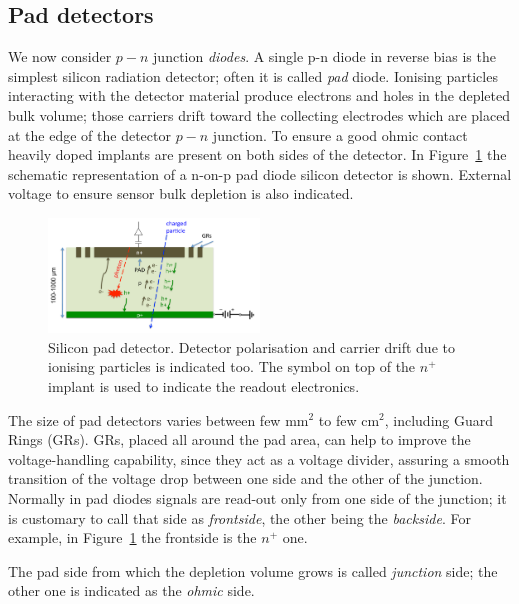 \subsection{Pad detectors}
\label{sec:pads}

We now consider $p-n$ junction {\it diodes}.
A single p-n diode in reverse bias is the simplest silicon radiation detector; 
often it is called {\it pad} diode. Ionising  particles interacting with  the detector material 
produce electrons and holes in the depleted bulk volume; those carriers drift toward 
the collecting electrodes which are placed at the edge of the detector $p-n$ junction. 
To ensure 
a good ohmic contact heavily doped implants are present on both sides of the detector. 
In Figure~\ref{fig:pad} the schematic representation  of a n-on-p pad diode silicon detector is 
shown. External voltage to ensure sensor bulk depletion is also indicated.  


\begin{figure}[!htbp]
   \centering
   \includegraphics[width=0.5\textwidth]{pad.pdf} 
      \caption{\label{fig:pad} Silicon pad detector. Detector polarisation and carrier drift due to 
      ionising particles is indicated too. The symbol on top of the $n^+$ implant is used to indicate the 
      readout electronics.}
\end{figure}
The size of pad detectors varies between few mm$^2$ to few cm$^2$,
including Guard Rings (GRs).  GRs, placed all
around the pad area, can help to improve the voltage-handling capability, since they act as a 
voltage divider, assuring a smooth transition of the voltage drop between one side 
and the other of the junction. 
Normally in pad diodes signals are read-out only from one side of the junction; it is customary 
to call that side as {\it frontside}, the other being the {\it backside}. 
For example, in Figure~\ref{fig:pad} the 
frontside is the $n^+$ one.

The pad side from which the depletion volume grows is called {\it junction} side; the other 
one is indicated as the {\it ohmic} side.

